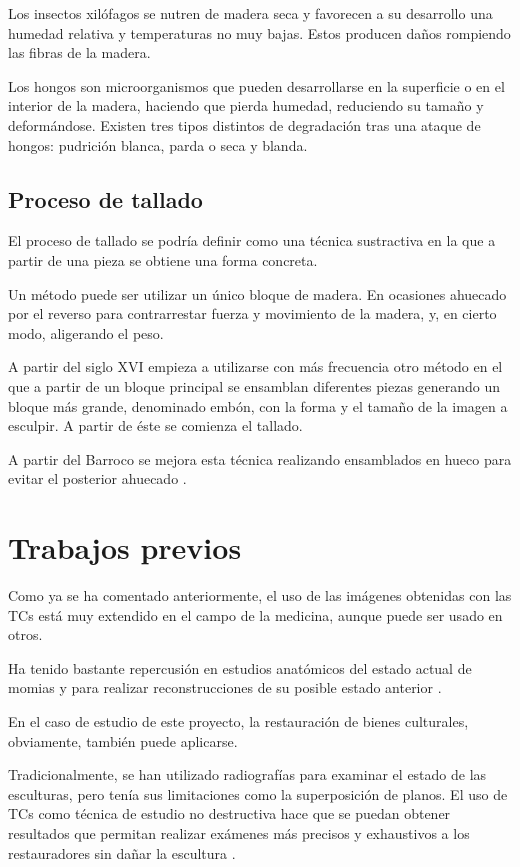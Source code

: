 Los insectos xilófagos se nutren de madera seca y favorecen a su desarrollo una humedad relativa y temperaturas no muy bajas. Estos producen daños rompiendo las fibras de la madera.

Los hongos son microorganismos que pueden desarrollarse en la superficie o en el interior de la madera, haciendo que pierda humedad, reduciendo su tamaño y deformándose. Existen tres tipos distintos de degradación tras una ataque de hongos: pudrición blanca, parda o seca y blanda.

\subsection{Proceso de tallado}

El proceso de tallado se podría definir como una técnica sustractiva en la que a partir de una pieza se obtiene una forma concreta.

Un método puede ser utilizar un único bloque de madera. En ocasiones ahuecado por el reverso para contrarrestar fuerza y movimiento de la madera, y, en cierto modo, aligerando el peso.

A partir del siglo XVI empieza a utilizarse con más frecuencia otro método en el que a partir de un bloque principal se ensamblan diferentes piezas generando un bloque más grande, denominado embón, con la forma y el tamaño de la imagen a esculpir. A partir de éste se comienza el tallado.

A partir del Barroco se mejora esta técnica realizando ensamblados en hueco para evitar el posterior ahuecado \cite{tc_esculturas}.

\section{Trabajos previos}

Como ya se ha comentado anteriormente, el uso de las imágenes obtenidas con las TCs está muy extendido en el campo de la medicina, aunque puede ser usado en otros. 

Ha tenido bastante repercusión en estudios anatómicos del estado actual de momias \cite{mummies} y para realizar reconstrucciones de su posible estado anterior \cite{mummies_reconstruction}.

En el caso de estudio de este proyecto, la restauración de bienes culturales, obviamente, también puede aplicarse.

Tradicionalmente, se han utilizado radiografías para examinar el estado de las esculturas, pero tenía sus limitaciones como la superposición de planos. El uso de TCs como técnica de estudio no destructiva hace que se puedan obtener resultados que permitan realizar exámenes más precisos y exhaustivos a los restauradores sin dañar la escultura \cite{tc_esculturas}.


